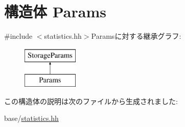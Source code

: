 \hypertarget{structStats_1_1StatStor_1_1Params}{
\section{構造体 Params}
\label{structStats_1_1StatStor_1_1Params}
}


{\ttfamily \#include $<$statistics.hh$>$}Paramsに対する継承グラフ:\begin{figure}[H]
\begin{center}
\leavevmode
\includegraphics[height=2cm]{structStats_1_1StatStor_1_1Params}
\end{center}
\end{figure}


この構造体の説明は次のファイルから生成されました:\begin{DoxyCompactItemize}
\item 
base/\hyperlink{statistics_8hh}{statistics.hh}\end{DoxyCompactItemize}
